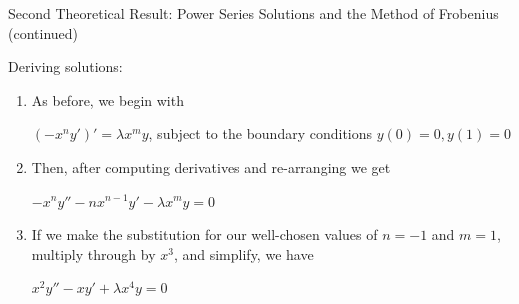 \documentclass{beamer}
\begin{document}
\begin{frame}{Second Theoretical Result: Power Series Solutions and the Method of Frobenius (continued)}

Deriving solutions:

\begin{enumerate}

\item As before, we begin with

\begin{center}

\begin{varblock}[12cm]

$(-x^ny')'=\lambda x^my$, subject to the boundary conditions $y(0)=0, y(1)=0$

\end{varblock}

\end{center}

\item Then, after computing derivatives and re-arranging we get

\begin{center}

\begin{minipage}{5cm}

\begin{varblock}[5cm]

$-x^ny''-nx^{n-1}y'-\lambda x^my=0$

\end{varblock}

\end{minipage}

\end{center}

\item If we make the substitution for our well-chosen values of $n=-1$ and $m=1$, multiply through by $x^3$, and simplify, we have

\begin{center}

\begin{minipage}{4cm}

\begin{varblock}[4cm]

$x^2y''-xy'+\lambda x^4y=0$

\end{varblock}

\end{minipage}

\end{center}

\asuivre

\end{enumerate}

\end{frame}
\end{document}
